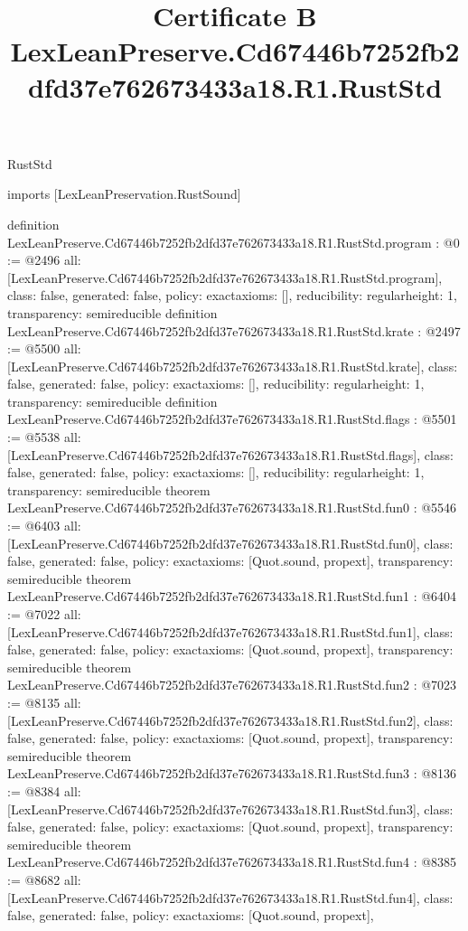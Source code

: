 \begin{lexlean}{RustStd}
\title{Certificate B LexLeanPreserve.Cd67446b7252fb2dfd37e762673433a18.R1.RustStd}
\begin{coremodule}
imports [LexLeanPreservation.RustSound]

definition LexLeanPreserve.Cd67446b7252fb2dfd37e762673433a18.R1.RustStd.program : @0 := @2496 {
  all: [LexLeanPreserve.Cd67446b7252fb2dfd37e762673433a18.R1.RustStd.program],
  class: false,
  generated: false,
  policy: exact{axioms: []},
  reducibility: regular{height: 1},
  transparency: semireducible
}
definition LexLeanPreserve.Cd67446b7252fb2dfd37e762673433a18.R1.RustStd.krate : @2497 := @5500 {
  all: [LexLeanPreserve.Cd67446b7252fb2dfd37e762673433a18.R1.RustStd.krate],
  class: false,
  generated: false,
  policy: exact{axioms: []},
  reducibility: regular{height: 1},
  transparency: semireducible
}
definition LexLeanPreserve.Cd67446b7252fb2dfd37e762673433a18.R1.RustStd.flags : @5501 := @5538 {
  all: [LexLeanPreserve.Cd67446b7252fb2dfd37e762673433a18.R1.RustStd.flags],
  class: false,
  generated: false,
  policy: exact{axioms: []},
  reducibility: regular{height: 1},
  transparency: semireducible
}
theorem LexLeanPreserve.Cd67446b7252fb2dfd37e762673433a18.R1.RustStd.fun0 : @5546 := @6403 {
  all: [LexLeanPreserve.Cd67446b7252fb2dfd37e762673433a18.R1.RustStd.fun0],
  class: false,
  generated: false,
  policy: exact{axioms: [Quot.sound, propext]},
  transparency: semireducible
}
theorem LexLeanPreserve.Cd67446b7252fb2dfd37e762673433a18.R1.RustStd.fun1 : @6404 := @7022 {
  all: [LexLeanPreserve.Cd67446b7252fb2dfd37e762673433a18.R1.RustStd.fun1],
  class: false,
  generated: false,
  policy: exact{axioms: [Quot.sound, propext]},
  transparency: semireducible
}
theorem LexLeanPreserve.Cd67446b7252fb2dfd37e762673433a18.R1.RustStd.fun2 : @7023 := @8135 {
  all: [LexLeanPreserve.Cd67446b7252fb2dfd37e762673433a18.R1.RustStd.fun2],
  class: false,
  generated: false,
  policy: exact{axioms: [Quot.sound, propext]},
  transparency: semireducible
}
theorem LexLeanPreserve.Cd67446b7252fb2dfd37e762673433a18.R1.RustStd.fun3 : @8136 := @8384 {
  all: [LexLeanPreserve.Cd67446b7252fb2dfd37e762673433a18.R1.RustStd.fun3],
  class: false,
  generated: false,
  policy: exact{axioms: [Quot.sound, propext]},
  transparency: semireducible
}
theorem LexLeanPreserve.Cd67446b7252fb2dfd37e762673433a18.R1.RustStd.fun4 : @8385 := @8682 {
  all: [LexLeanPreserve.Cd67446b7252fb2dfd37e762673433a18.R1.RustStd.fun4],
  class: false,
  generated: false,
  policy: exact{axioms: [Quot.sound, propext]},
}
\end{coremodule}
\end{lexlean}
